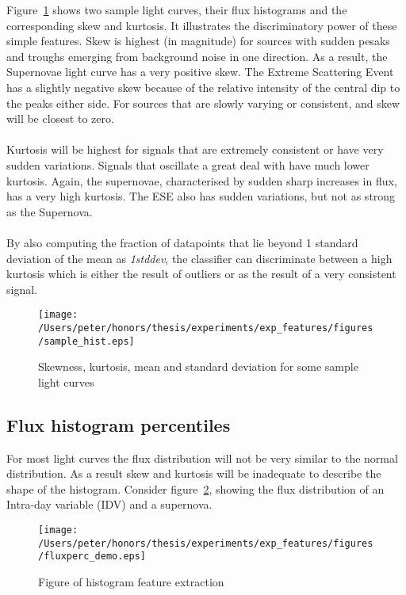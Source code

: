 	Figure~\ref{fig:samplestats} shows two sample light curves, their flux histograms and the corresponding skew and kurtosis.  It illustrates the discriminatory power of these simple features.
	Skew is highest (in magnitude) for sources with sudden pesaks and troughs emerging from background noise in one direction. As a result, the Supernovae light curve has a very positive skew. The Extreme Scattering Event has a slightly negative skew because of the relative intensity of the central dip to the peaks either side. For sources that are slowly varying or consistent, and skew will be closest to zero. \\ \\
	Kurtosis will be highest for signals that are extremely consistent or have very sudden variations. Signals that oscillate a great deal with have much lower kurtosis. Again, the supernovae, characterised by sudden sharp increases in flux, has a very high kurtosis. The ESE also has sudden variations, but not as strong as the Supernova. \\ \\
	By also computing the fraction of datapoints that lie beyond 1 standard deviation of the mean as \emph{1stddev}, the classifier can discriminate between a high kurtosis which is either the result of outliers or as the result of a very consistent signal.
		
	\begin{figure}[ht!]
		\label{fig:samplestats}
		\centering
		\texttt{[image: /Users/peter/honors/thesis/experiments/exp\_features/figures/sample\_hist.eps]}
		\caption{Skewness, kurtosis, mean and standard deviation for some sample light curves}
	\end{figure}
	
	
	
	\subsection{Flux histogram percentiles}
	For most light curves the flux distribution will not be very similar to the normal distribution. As a result skew and kurtosis will be inadequate to describe the shape of the histogram. Consider figure~\ref{fig:histograms}, showing the flux distribution of an Intra-day variable (IDV) and a supernova.  \\
	
	\begin{figure}[ht!]
		\centering
		\label{fig:histograms}
		\texttt{[image: /Users/peter/honors/thesis/experiments/exp\_features/figures/fluxperc\_demo.eps]}
		\caption{Figure of histogram feature extraction}
	\end{figure}
	
